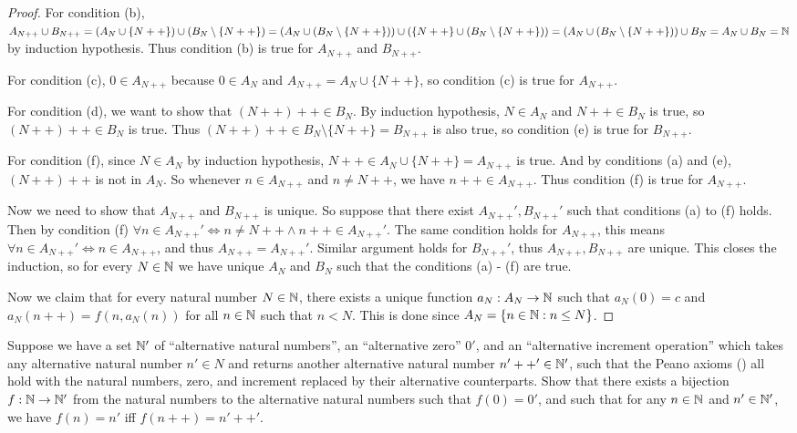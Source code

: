 \begin{proof}
  For condition (b), \(A_{N++} \cup B_{N++} = (A_N \cup \{N++\}) \cup (B_N \setminus \{N++\}) = (A_N \cup (B_N \setminus \{N++\})) \cup (\{N++\} \cup (B_N \setminus \{N++\})) = (A_N \cup (B_N \setminus \{N++\})) \cup B_N = A_N \cup B_N = \mathbb{N}\) by induction hypothesis.
  Thus condition (b) is true for \(A_{N++}\) and \(B_{N++}\).

  For condition (c), \(0 \in A_{N++}\) because \(0 \in A_N\) and \(A_{N++} = A_N \cup \{N++\}\), so condition (c) is true for \(A_{N++}\).

  For condition (d), we want to show that \((N++)++ \in B_N\).
  By induction hypothesis, \(N \in A_N\) and \(N++ \in B_N\) is true, so \((N++)++ \in B_N\) is true.
  Thus \((N++)++ \in B_N \setminus \{N++\} = B_{N++}\) is also true, so condition (e) is true for \(B_{N++}\).

  For condition (f), since \(N \in A_N\) by induction hypothesis, \(N++ \in A_N \cup \{N++\} = A_{N++}\) is true.
  And by conditions (a) and (e), \((N++)++\) is not in \(A_N\).
  So whenever \(n \in A_{N++}\) and \(n \neq N++\), we have \(n++ \in A_{N++}\).
  Thus condition (f) is true for \(A_{N++}\).

  Now we need to show that \(A_{N++}\) and \(B_{N++}\) is unique.
  So suppose that there exist \(A_{N++}', B_{N++}'\) such that conditions (a) to (f) holds.
  Then by condition (f) \(\forall n \in A_{N++}' \iff n \neq N++ \land n++ \in A_{N++}'\).
  The same condition holds for \(A_{N++}\), this means \(\forall n \in A_{N++}' \iff n \in A_{N++}\), and thus \(A_{N++} = A_{N++}'\).
  Similar argument holds for \(B_{N++}'\), thus \(A_{N++}, B_{N++}\) are unique.
  This closes the induction, so for every \(N \in \mathbb{N}\) we have unique \(A_N\) and \(B_N\) such that the conditions (a) - (f) are true.

  Now we claim that for every natural number \(N \in \mathbb{N}\), there exists a unique function \(a_N : A_N \to \mathbb{N}\) such that \(a_N(0) = c\) and \(a_N(n++) = f(n, a_{N}(n))\) for all \(n \in \mathbb{N}\) such that \(n < N\).
  This is done since \(A_N = \{n \in \mathbb{N} : n \leq N\}\).
\end{proof}

\begin{ex}\label{ex:3.5.13}
  Suppose we have a set \(\mathbb{N}'\) of ``alternative natural numbers'', an ``alternative zero'' \(0'\), and an ``alternative increment operation'' which takes any alternative natural number \(n' \in N\) and returns another alternative natural number \(n'++' \in \mathbb{N}'\), such that the Peano axioms () all hold with the natural numbers, zero, and increment replaced by their alternative counterparts.
  Show that there exists a bijection \(f : \mathbb{N} \to \mathbb{N}'\) from the natural numbers to the alternative natural numbers such that \(f(0) = 0'\), and such that for any \(n \in \mathbb{N}\) and \(n' \in \mathbb{N}'\), we have \(f(n) = n'\) iff \(f(n++) = n'++'\).
\end{ex}

